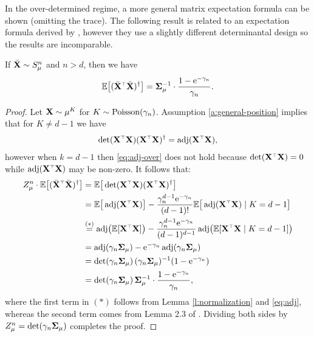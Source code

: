 In the over-determined regime, a more general matrix expectation
formula can be shown (omitting the trace). The following result is
related to an expectation formula derived by
\cite{correcting-bias-journal}, however they use a slightly
different determinantal design so the results are incomparable.
\begin{lemma}\label{l:sqinv-over}
If ${\bar{\mathbf X}}\sim S_\mu^n$ and $n>d$, then we
have
\begin{align*}
  \E\big[ (\Xb^\top\Xb)^{\dagger}\big] =
  \Sigmab_\mu^{-1}\cdot \frac{1-\ee^{-\gamma_n}}{\gamma_n}.
\end{align*}
\end{lemma}
\begin{proof}
Let $\mathbf X\sim\mu^K$ for $K\sim{\operatorname{Poisson}}(\gamma_n)$. Assumption
\ref{a:general-position} implies that for $K\neq d-1$ we have
\begin{align}
  \det(\X^\top\X)(\X^\top\X)^\dagger=\adj(\X^\top\X),\label{eq:adj-over}
  \end{align}
however when $k=d-1$ then \eqref{eq:adj-over} does not hold because
$\det(\X^\top\X)=0$ while $\adj(\X^\top\X)$ may be non-zero. It
follows that:
  \begin{align*}
Z_\mu^n\cdot
    \E\big[ (\Xb^\top\Xb)^{\dagger}\big]
    &=\E\big[\det(\X^\top\X)(\X^\top\X)^\dagger\big]\\
    &=\E\big[\adj(\X^\top\X)\big]-
\frac{\gamma_n^{d-1}\ee^{-\gamma_n}}{(d-1)!}
      \E\big[\adj(\X^\top\X)\mid K=d-1\big]\\
    &\overset{(*)}{=}\adj\!\big(\E[\X^\top\X]\big) -
      \frac{\gamma_n^{d-1}\ee^{-\gamma_n}}{(d-1)^{d-1}}
      \adj\!\big(\E[\X^\top\X\mid K=d-1]\big)\\
    &=\adj(\gamma_n\Sigmab_\mu) - \ee^{-\gamma_n}\adj(\gamma_n\Sigmab_\mu)\\
    &=\det(\gamma_n\Sigmab_\mu)\,(\gamma_n\Sigmab_\mu)^{-1}(1-\ee^{-\gamma_n})\\
    &=\det(\gamma_n\Sigmab_\mu)\,\Sigmab_\mu^{-1}\cdot\frac{1-\ee^{-\gamma_n}}{\gamma_n},
  \end{align*}
  where the first term in $(*)$ follows from Lemma
  \ref{l:normalization} and \eqref{eq:adj}, whereas the second term comes
  from Lemma 2.3 of \cite{correcting-bias-journal}.
Dividing both sides by $Z_\mu^n=\det(\gamma_n\mathbf{\Sigma}_\mu)$ completes the proof.
\end{proof}

